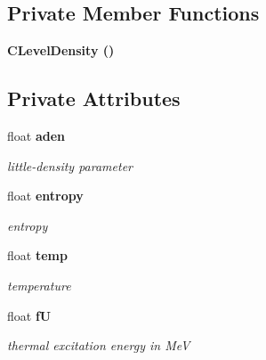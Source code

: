 \subsection*{Private Member Functions}
\begin{CompactItemize}
\item 
\bf{CLevel\-Density} ()
\end{CompactItemize}
\subsection*{Private Attributes}
\begin{CompactItemize}
\item 
float \bf{aden}\label{classCLevelDensity_1806204a907f25a442252c512adfbee8}

\begin{CompactList}\small\item\em little-density parameter \item\end{CompactList}\item 
float \bf{entropy}\label{classCLevelDensity_f678ed429f345194a54e903d1f0988dd}

\begin{CompactList}\small\item\em entropy \item\end{CompactList}\item 
float \bf{temp}\label{classCLevelDensity_4a16e3d0e061122756fd2fd08475cf71}

\begin{CompactList}\small\item\em temperature \item\end{CompactList}\item 
float \bf{f\-U}\label{classCLevelDensity_7d128ac299d6d28df0aeca5ee920756a}

\begin{CompactList}\small\item\em thermal excitation energy in Me\-V \item\end{CompactList}\end{CompactItemize}
